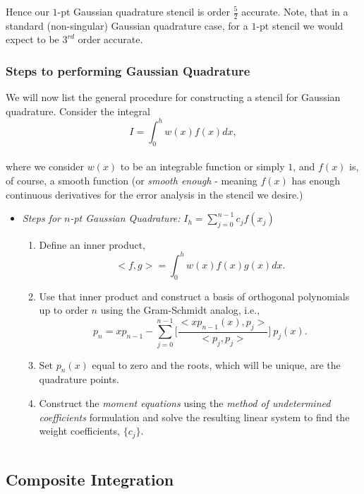 \documentclass[paper=a4, fontsize=11pt]{scrartcl} %
\numberwithin{equation}{section} %
\numberwithin{figure}{section} %
\numberwithin{table}{section} %
\begin{document}
 Hence our $1$-pt Gaussian quadrature stencil is order $\frac{5}{2}$ accurate. Note, that in a standard (non-singular) Gaussian quadrature case, for a $1$-pt stencil we would expect to be $3^{rd}$ order accurate.\\
 
 
\subsubsection{Steps to performing Gaussian Quadrature}

We will now list the general procedure for constructing a stencil for Gaussian quadrature. Consider the integral\\ $$I = \int_0^h w(x) f(x) dx,$$\\ where we consider $w(x)$ to be an integrable function or simply $1$, and $f(x)$ is, of course, a smooth function (or \emph{smooth enough} - meaning $f(x)$ has enough continuous derivatives for the error analysis in the stencil we desire.) \\

\begin{itemize}
\item \emph{Steps for $n$-pt Gaussian Quadrature:} $I_h = \sum_{j=0}^{n-1} c_j f(x_j)$\\
\begin{enumerate}
\item Define an inner product, $$<f,g> = \int_0^h w(x) f(x) g(x) dx.$$
\item Use that inner product and construct a basis of orthogonal polynomials up to order $n$ using the Gram-Schmidt analog, i.e.,
$$p_{n} = xp_{n-1} - \sum_{j=0}^{n-1} \Bigg[ \frac{<xp_{n-1}(x), p_j>}{<p_j,p_j>} \Bigg]\ p_j(x).$$
\item Set $p_n(x)$ equal to zero and the roots, which will be unique, are the quadrature points.
\item Construct the \emph{moment equations} using the \emph{method of undetermined coefficients} formulation and solve the resulting linear system to find the weight coefficients, $\{c_j\}$.
\end{enumerate}
\end{itemize}

$ $\\


 \subsection{Composite Integration}
 
\end{document}
